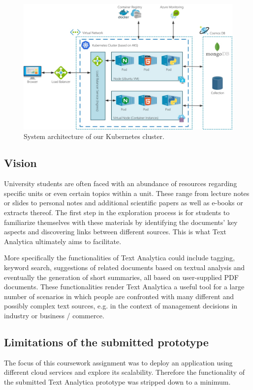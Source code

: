 \documentclass[conference]{IEEEtran}
\begin{document}
\begin{figure}[ht!]
\includegraphics[width=150mm]{img/architecture.jpeg}
\caption{System architecture of our Kubernetes cluster.}
\label{img:architecture}
\end{figure}

\subsection{Vision}
University students are often faced with an abundance of resources regarding specific units or even certain topics within a unit. These range from lecture notes or slides to personal notes and additional scientific papers as well as e-books or extracts thereof. The first step in the exploration process is for students to familiarize themselves with these materials by identifying the documents’ key aspects and discovering links between different sources. This is what Text Analytica ultimately aims to facilitate.

More specifically the functionalities of Text Analytica could include tagging, keyword search, suggestions of related documents based on textual analysis and eventually the generation of short summaries, all based on user-supplied PDF documents. These functionalities render Text Analytica a useful tool for a large number of scenarios in which people are confronted with many different and possibly complex text sources, e.g. in the context of management decisions in industry or business / commerce.

\subsection{Limitations of the submitted prototype}
The focus of this coursework assignment was to deploy an application using different cloud services and explore its scalability. Therefore the functionality of the submitted Text Analytica prototype was stripped down to a minimum.
\end{document}
